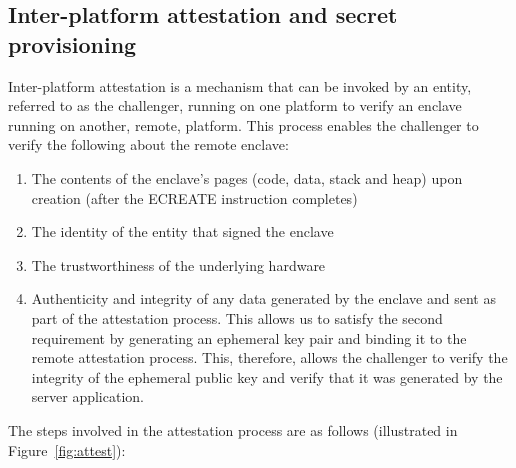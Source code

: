 \documentclass[../main.tex]{subfiles}
\begin{document}
\subsection{Inter-platform attestation and secret provisioning} %
Inter-platform attestation is a mechanism that can be invoked by an entity, referred to as the challenger, running on one platform
to verify an enclave running on another, remote, platform. This process enables the challenger to verify the following about the remote enclave:
\begin{enumerate}
	\item The contents of the enclave's pages (code, data, stack and heap) upon creation (after the ECREATE instruction completes)
	\item The identity of the entity that signed the enclave 
	\item The trustworthiness of the underlying hardware
	\item Authenticity and integrity of any data generated by the enclave and sent as part of the attestation process. This allows us to satisfy the second requirement by generating an ephemeral key
	      pair and binding it to the remote attestation process. This, therefore, allows the challenger to verify the integrity of the ephemeral public key and verify that it was generated by the server application.
\end{enumerate}
The steps involved in the attestation process are as follows (illustrated in Figure~\ref{fig:attest}):
\end{document}
